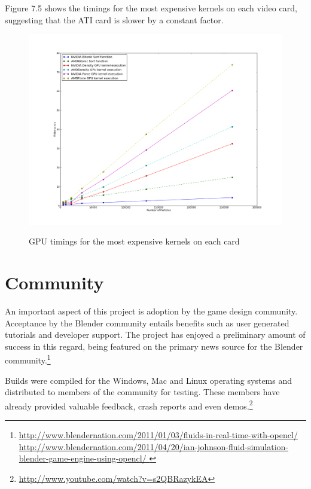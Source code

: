 \pagebreak
Figure 7.5 shows the timings for the most expensive kernels on each video card,
suggesting that the ATI card is slower by a constant factor.

\begin{figure}[!htc]
 		\centering
		\includegraphics[scale=0.4]{figures/nv_vs_ati.png}
		\label{fig:logic}
        \caption{ GPU timings for the most expensive kernels on each card }
\end{figure}


\pagebreak
\section{Community}


An important aspect of this project is adoption by the game design community.
Acceptance by the Blender community entails benefits such as user generated
tutorials and developer support. The project has enjoyed a preliminary amount
of success in this regard, being featured on the primary news source for
the Blender community.\footnote{
\url{http://www.blendernation.com/2011/01/03/fluids-in-real-time-with-opencl/}
\\ 
\url{
http://www.blendernation.com/2011/04/20/ian-johnson-fluid-simulation-blender-game-engine-using-opencl/
} }

Builds were compiled for the Windows, Mac and Linux operating systems and
distributed to members of the community for testing. These members have already
provided valuable feedback, crash reports and even demos.\footnote{ \url{http://www.youtube.com/watch?v=s2QBRazykEA}} 

